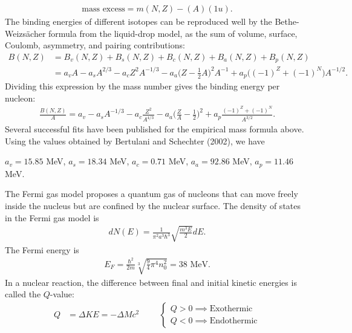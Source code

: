 \begin{align}
\textrm{mass excess}=m(N,Z)-(A)(1 u).
\end{align} 
The binding energies of different isotopes can be reproduced well by the Bethe-Weizs\"{a}cher formula from the liquid-drop model, as the sum of volume, surface, Coulomb, asymmetry, and pairing contributions:
\begin{align}
B(N,Z)&=B_v(N,Z)+B_s(N,Z)+B_c(N,Z)+B_a(N,Z)+B_p(N,Z) \\
&=a_vA-a_sA^{2/3}-a_cZ^2A^{-1/3}-a_a\bigg(Z-\frac{1}{2}A \bigg)^2A^{-1}+a_p\big((-1)^Z+(-1)^N \big)A^{-1/2}.
\end{align}
Dividing this expression by the mass number gives the binding energy per nucleon:
\begin{align}
\frac{B(N,Z)}{A}=a_v-a_sA^{-1/3}-a_c\frac{Z^2}{A^{4/3}}-a_a\bigg(\frac{Z}{A}-\frac{1}{2} \bigg)^2+a_p\frac{(-1)^Z+(-1)^N}{A^{3/2}}.
\end{align}
Several successful fits have been published for the empirical mass formula above. Using the values obtained by Bertulani and Schechter (2002), we have
\begin{center}
	$a_v=15.85$ MeV, $a_s=18.34$ MeV, $a_c=0.71$ MeV, $a_a=92.86$ MeV, $a_p=11.46$ MeV. 
\end{center}
The Fermi gas model proposes a quantum gas of nucleons that can move freely inside the nucleus but are confined by the nuclear surface. The density of states in the Fermi gas model is 
\begin{align}
dN(E)=\frac{1}{\pi^2 a^3\hbar^3}\sqrt{\frac{m^3E}{2}}dE.
\end{align}
The Fermi energy is
\begin{align}
E_F=\frac{\hbar^2}{2m}\sqrt[3]{\frac{9}{4}\pi^4n_0^2}=38 \textrm{ MeV}.
\end{align}
In a nuclear reaction, the difference between final and initial
kinetic energies is called the $Q$-value:
\begin{align}
Q&=\Delta KE=-\Delta Mc^2 \hspace{1cm}
\begin{cases}
Q>0 \implies \textrm{Exothermic} \\
Q<0 \implies \textrm{Endothermic}
\end{cases}
\end{align}







